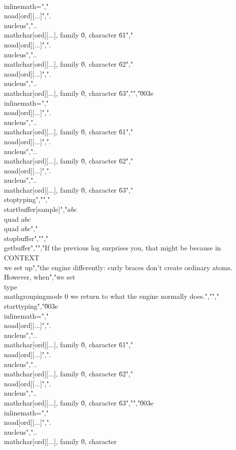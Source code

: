 \\inlinemath=","\\noad[ord][...]",".\\nucleus","..\\mathchar[ord][...], family \"0, character \"61","\\noad[ord][...]",".\\nucleus","..\\mathchar[ord][...], family \"0, character \"62","\\noad[ord][...]",".\\nucleus","..\\mathchar[ord][...], family \"0, character \"63","","\u003e \\inlinemath=","\\noad[ord][...]",".\\nucleus","..\\mathchar[ord][...], family \"0, character \"61","\\noad[ord][...]",".\\nucleus","..\\mathchar[ord][...], family \"0, character \"62","\\noad[ord][...]",".\\nucleus","..\\mathchar[ord][...], family \"0, character \"63","\\stoptyping","","\\startbuffer[sample]","${a} {b} {c}$ \\quad ${a} {bc}$ \\quad ${abc}$","\\stopbuffer","","\\getbuffer","","If the previous log surprises you, that might be because in \\CONTEXT\\ we set up","the engine differently: curly braces don't create ordinary atoms. However, when","we set \\type {\\mathgroupingmode 0} we return to what the engine normally does.","","\\starttyping","\u003e \\inlinemath=","\\noad[ord][...]",".\\nucleus","..\\mathchar[ord][...], family \"0, character \"61","\\noad[ord][...]",".\\nucleus","..\\mathchar[ord][...], family \"0, character \"62","\\noad[ord][...]",".\\nucleus","..\\mathchar[ord][...], family \"0, character \"63","","\u003e \\inlinemath=","\\noad[ord][...]",".\\nucleus","..\\mathchar[ord][...], family \"0, character 